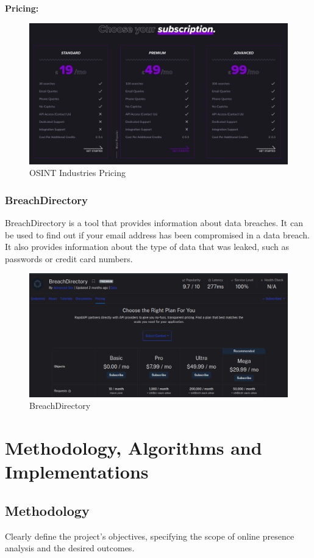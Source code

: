 \documentclass[openany]{report}
\begin{document}
\textbf{Pricing:}
\begin{figure}[H]
    \centering
    \includegraphics[width=.95\textwidth]{./imgs/5.png}
    \caption{OSINT Industries Pricing}
\end{figure}

\subsection{BreachDirectory}
BreachDirectory is a tool that provides information about data breaches. It can be used to find out if your email address has been compromised in a data breach. It also provides information about the type of data that was leaked, such as passwords or credit card numbers.

\begin{figure}[H]
    \centering
    \includegraphics[width=.95\textwidth]{./imgs/6.png}
    \caption{BreachDirectory}
\end{figure}


\chapter{Methodology, Algorithms and Implementations}
\section{Methodology}
Clearly define the project's objectives, specifying the scope of online presence analysis and the desired outcomes.
\end{document}
